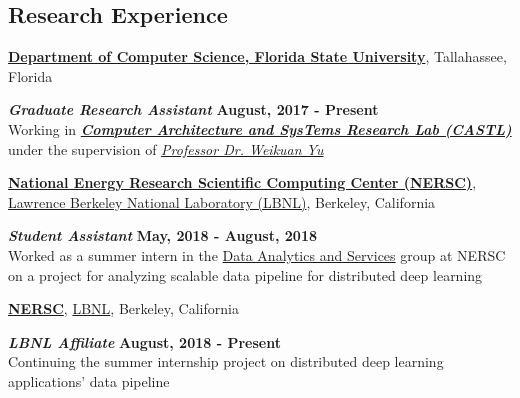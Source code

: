\documentclass[margin,line]{res}
\begin{document}
\begin{resume}
\vspace*{-.1in}

\section{\sc Research Experience}
{\bf \href{http://www.cs.fsu.edu/}{Department of Computer Science, Florida State University}}, Tallahassee, Florida

\vspace{-.4cm}
\textbf{{\em Graduate Research Assistant}} \hfill {\bf August, 2017 - Present}\\
Working in \textbf{\textit{\href{http://castl.cs.fsu.edu/doku.php/}{Computer Architecture and SysTems Research Lab (CASTL)}}} under the supervision of \textit{\href{https://www.cs.fsu.edu/~yuw/}{Professor Dr. Weikuan Yu}}

\vspace{-.2cm}
{\bf \href{http://www.nersc.gov/}{National Energy Research Scientific Computing Center (NERSC)}}, \href{http://www.lbl.gov/}{Lawrence Berkeley National Laboratory (LBNL)}, Berkeley, California

\vspace{-.4cm}
\textbf{{\em Student Assistant}} \hfill {\bf May, 2018 - August, 2018}\\
Worked as a summer intern in the \href{http://www.nersc.gov/users/data-analytics/}{Data Analytics and Services} group at NERSC on a project for analyzing scalable data pipeline for distributed deep learning

\vspace{-.2cm}
{\bf \href{http://www.nersc.gov/}{NERSC}}, \href{http://www.lbl.gov/}{LBNL}, Berkeley, California

\vspace{-.4cm}
\textbf{{\em LBNL Affiliate}} \hfill {\bf August, 2018 - Present}\\
Continuing the summer internship project on distributed deep learning applications' data pipeline

\vspace*{-.1in}


\end{resume}
\end{document}
